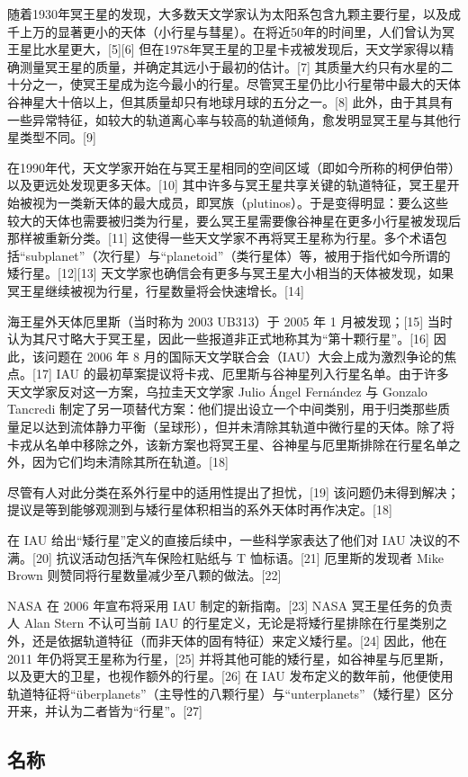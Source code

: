 随着1930年冥王星的发现，大多数天文学家认为太阳系包含九颗主要行星，以及成千上万的显著更小的天体（小行星与彗星）。在将近50年的时间里，人们曾认为冥王星比水星更大，[5][6] 但在1978年冥王星的卫星卡戎被发现后，天文学家得以精确测量冥王星的质量，并确定其远小于最初的估计。[7] 其质量大约只有水星的二十分之一，使冥王星成为迄今最小的行星。尽管冥王星仍比小行星带中最大的天体谷神星大十倍以上，但其质量却只有地球月球的五分之一。[8] 此外，由于其具有一些异常特征，如较大的轨道离心率与较高的轨道倾角，愈发明显冥王星与其他行星类型不同。[9]

在1990年代，天文学家开始在与冥王星相同的空间区域（即如今所称的柯伊伯带）以及更远处发现更多天体。[10] 其中许多与冥王星共享关键的轨道特征，冥王星开始被视为一类新天体的最大成员，即冥族（plutinos）。于是变得明显：要么这些较大的天体也需要被归类为行星，要么冥王星需要像谷神星在更多小行星被发现后那样被重新分类。[11] 这使得一些天文学家不再将冥王星称为行星。多个术语包括“subplanet”（次行星）与“planetoid”（类行星体）等，被用于指代如今所谓的矮行星。[12][13] 天文学家也确信会有更多与冥王星大小相当的天体被发现，如果冥王星继续被视为行星，行星数量将会快速增长。[14]

海王星外天体厄里斯（当时称为 2003 UB313）于 2005 年 1 月被发现；[15] 当时认为其尺寸略大于冥王星，因此一些报道非正式地称其为“第十颗行星”。[16] 因此，该问题在 2006 年 8 月的国际天文学联合会（IAU）大会上成为激烈争论的焦点。[17] IAU 的最初草案提议将卡戎、厄里斯与谷神星列入行星名单。由于许多天文学家反对这一方案，乌拉圭天文学家 Julio Ángel Fernández 与 Gonzalo Tancredi 制定了另一项替代方案：他们提出设立一个中间类别，用于归类那些质量足以达到流体静力平衡（呈球形），但并未清除其轨道中微行星的天体。除了将卡戎从名单中移除之外，该新方案也将冥王星、谷神星与厄里斯排除在行星名单之外，因为它们均未清除其所在轨道。[18]

尽管有人对此分类在系外行星中的适用性提出了担忧，[19] 该问题仍未得到解决；提议是等到能够观测到与矮行星体积相当的系外天体时再作决定。[18]

在 IAU 给出“矮行星”定义的直接后续中，一些科学家表达了他们对 IAU 决议的不满。[20] 抗议活动包括汽车保险杠贴纸与 T 恤标语。[21] 厄里斯的发现者 Mike Brown 则赞同将行星数量减少至八颗的做法。[22]

NASA 在 2006 年宣布将采用 IAU 制定的新指南。[23] NASA 冥王星任务的负责人 Alan Stern 不认可当前 IAU 的行星定义，无论是将矮行星排除在行星类别之外，还是依据轨道特征（而非天体的固有特征）来定义矮行星。[24] 因此，他在 2011 年仍将冥王星称为行星，[25] 并将其他可能的矮行星，如谷神星与厄里斯，以及更大的卫星，也视作额外的行星。[26] 在 IAU 发布定义的数年前，他便使用轨道特征将“überplanets”（主导性的八颗行星）与“unterplanets”（矮行星）区分开来，并认为二者皆为“行星”。[27]
\subsection{名称}

